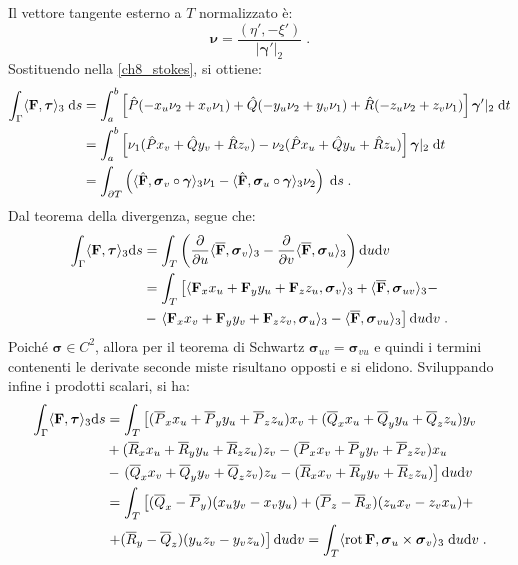 \documentclass[a4paper,12pt]{report}
\theoremstyle{plain}
\theoremstyle{definition}
\theoremstyle{remark}
\newcommand{\Rot}{\mathrm{rot}\,}
\newcommand{\ov}[1]{\overline{#1}}
\newcommand{\BF}[1]{\boldsymbol{#1}}
\newcommand{\diff}[1]{\mathrm{d}#1}
\numberwithin{equation}{section}
\begin{document}
Il vettore tangente esterno a $T$ normalizzato è:
\begin{equation}
\BF{\nu}=\frac{(\eta',-\xi')}{|\BF{\gamma}'|_2}\;.
\end{equation}
Sostituendo nella \eqref{ch8_stokes}, si ottiene:
\begin{align}
\int_{\Gamma}\langle\mathbf{F},\BF{\tau}\rangle_3\;\diff{s} &=\int_a^b\left[\hat{P}(-x_u\nu_2+x_v\nu_1)+\hat{Q}(-y_u\nu_2+y_v\nu_1)+\hat{R}(-z_u\nu_2+z_v\nu_1)\right]\BF{\gamma}'|_2\;\diff{t} \notag \\
&=\int_a^b\left[\nu_1(\hat{P}x_v+\hat{Q}y_v+\hat{R}z_v)-\nu_2(\hat{P}x_u+\hat{Q}y_u+\hat{R}z_u)\right]\BF{\gamma}|_2\;\diff{t} \notag \\
&=\int_{\partial T}\left(\langle\hat{\mathbf{F}},\BF{\sigma}_v\circ\BF{\gamma}\rangle_3\nu_1-\langle\hat{\mathbf{F}},\BF{\sigma}_u\circ\BF{\gamma}\rangle_3\nu_2\right)\;\diff{s}\;.
\end{align}
Dal teorema della divergenza, segue che:
\begin{align}
\int_{\Gamma}\langle\mathbf{F},\BF{\tau}\rangle_3\diff{s}&=\int_T\left(\frac{\partial}{\partial u}\langle\ov{\mathbf{F}},\BF{\sigma}_v\rangle_3-\frac{\partial}{\partial v}\langle \ov{\mathbf{F}},\BF{\sigma}_u\rangle_3\right)\diff{u}\diff{v} \notag \\
&=\int_T \left[\langle\mathbf{F}_xx_u+\mathbf{F}_yy_u+\mathbf{F}_zz_u,\BF{\sigma}_v\rangle_3+\langle \ov{\mathbf{F}},\BF{\sigma}_{uv}
\rangle_3-\right. \notag \\
&-\left.\langle\mathbf{F}_xx_v+\mathbf{F}_yy_v+\mathbf{F}_zz_v,\BF{\sigma}_u\rangle_3-\langle\ov{\mathbf{F}},\BF{\sigma}_{vu}\rangle_3
\right]\diff{u}\diff{v}\;.
\end{align}
Poiché $\BF{\sigma}\in C^2$, allora per il teorema di Schwartz $\BF{\sigma}_{uv}=\BF{\sigma}_{vu}$ e quindi i termini contenenti le 
derivate seconde miste risultano opposti e si elidono. Sviluppando infine i prodotti scalari, si ha:
\begin{align}
\int_{\Gamma}\langle\mathbf{F},\BF{\tau}\rangle_3\diff{s}&=\int_T\left[(\ov{P}_xx_u+\ov{P}_yy_u+\ov{P}_zz_u)x_v+(\ov{Q}_xx_u+\ov{Q}_yy_u+\ov{Q}_zz_u)y_v\right. \notag \\
&+(\ov{R}_xx_u+\ov{R}_yy_u+\ov{R}_zz_u)z_v-(\ov{P}_xx_v+\ov{P}_yy_v+\ov{P}_zz_v)x_u \notag \\
&-\left.(\ov{Q}_xx_v+\ov{Q}_yy_v+\ov{Q}_zz_v)z_u-(\ov{R}_xx_v+\ov{R}_yy_v+\ov{R}_zz_u)\right]\diff{u}\diff{v} \notag \\
&=\int_T\left[(\ov{Q}_x-\ov{P}_y)(x_uy_v-x_vy_u)+(\ov{P}_z-\ov{R}_x)(z_ux_v-z_vx_u)+\right. \notag \\
&\left.+(\ov{R}_y-\ov{Q}_z)(y_uz_v-y_vz_u)\right]\diff{u}\diff{v}=\int_T\langle \Rot\mathbf{F},\BF{\sigma}_u\times\BF{\sigma}_v\rangle_3\;\diff{u}\diff{v}\;.
\end{align}
\end{document}

